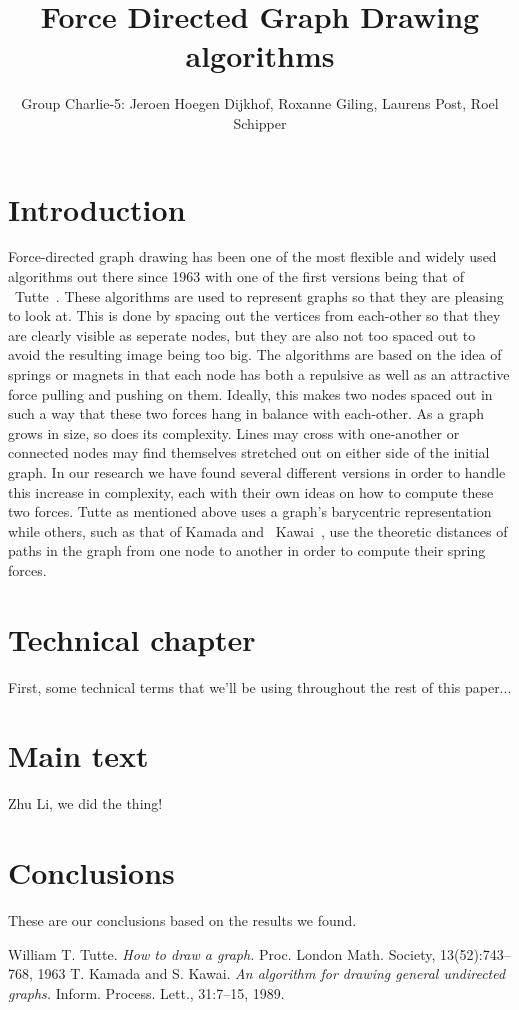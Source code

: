 \documentclass[a4paper,12pt,twoside]{article}
\begin{document}
\title{Force Directed Graph Drawing algorithms}
\author{Group Charlie-5: Jeroen Hoegen Dijkhof, Roxanne Giling, Laurens Post, Roel Schipper}
\newpage
\tableofcontents
\newpage
\section{Introduction}\label{s:Introduction}
Force-directed graph drawing has been one of the most flexible and widely used algorithms out there since 1963 with one of the first versions being that of ~Tutte~\cite{Tutte}. These algorithms are used to represent graphs so that they are pleasing to look at. This is done by spacing out the vertices from each-other so that they are clearly visible as seperate nodes, but they are also not too spaced out to avoid the resulting image being too big. The algorithms are based on the idea of springs or magnets in that each node has both a repulsive as well as an attractive force pulling and pushing on them. Ideally, this makes two nodes spaced out in such a way that these two forces hang in balance with each-other. As a graph grows in size, so does its complexity. Lines may cross with one-another or connected nodes may find themselves stretched out on either side of the initial graph. In our research we have found several different versions in order to handle this increase in complexity, each with their own ideas on how to compute these two forces. Tutte as mentioned above uses a graph's barycentric representation while others, such as that of Kamada and ~Kawai~\cite{Kawai}, use the theoretic distances of paths in the graph from one node to another in order to compute their spring forces.
\section{Technical chapter}
First, some technical terms that we'll be using throughout the rest of this paper...
\section{Main text}
Zhu Li, we did the thing!
\section{Conclusions}
These are our conclusions based on the results we found.
\begin{thebibliography}{99}
William T. Tutte. \emph{How to draw a graph.} Proc. London Math. Society, 13(52):743–768, 1963
T. Kamada and S. Kawai. \emph{An algorithm for drawing general undirected graphs.} Inform. Process. Lett., 31:7–15, 1989.
\end{thebibliography}
\end{document}
